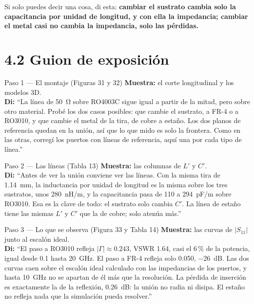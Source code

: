 \documentclass[11pt,letterpaper]{article}
\begin{document}
Si solo puedes decir una cosa, di esta: \textbf{cambiar el sustrato cambia solo la capacitancia por unidad de longitud, y con ella la impedancia; cambiar el metal casi no cambia la impedancia, solo las pérdidas.}

\section*{4.2 Guion de exposición}

\begin{paso}{Paso 1 --- El montaje (Figuras 31 y 32)}
\textbf{Muestra:} el corte longitudinal y los modelos 3D.\\
\textbf{Di:} ``La línea de \SI{50}{\ohm} sobre RO4003C sigue igual a partir de la mitad, pero sobre otro material. Probé los dos casos posibles: que cambie el sustrato, a FR-4 o a RO3010, y que cambie el metal de la tira, de cobre a estaño. Los dos planos de referencia quedan en la unión, así que lo que mido es solo la frontera. Como en las otras, corregí los puertos con líneas de referencia, aquí una por cada tipo de línea.''
\end{paso}

\begin{paso}{Paso 2 --- Las líneas (Tabla 13)}
\textbf{Muestra:} las columnas de $L'$ y $C'$.\\
\textbf{Di:} ``Antes de ver la unión conviene ver las líneas. Con la misma tira de \SI{1.14}{mm}, la inductancia por unidad de longitud es la misma sobre los tres sustratos, unos 280~nH/m, y la capacitancia pasa de 110 a 294~pF/m sobre RO3010. Esa es la clave de todo: el sustrato solo cambia $C'$. La línea de estaño tiene las mismas $L'$ y $C'$ que la de cobre; solo atenúa más.''
\end{paso}

\begin{paso}{Paso 3 --- Lo que se observa (Figura 33 y Tabla 14)}
\textbf{Muestra:} las curvas de $|S_{11}|$ junto al escalón ideal.\\
\textbf{Di:} ``El paso a RO3010 refleja $|\Gamma|\approx0.243$, VSWR 1.64, casi el 6\,\% de la potencia, igual desde \SI{0.1}{} hasta \SI{20}{GHz}. El paso a FR-4 refleja solo 0.050, \SI{-26}{dB}. Las dos curvas caen sobre el escalón ideal calculado con las impedancias de los puertos, y hasta \SI{10}{GHz} no se apartan de él más que la resolución. La pérdida de inserción es exactamente la de la reflexión, \SI{0.26}{dB}: la unión no radia ni disipa. El estaño no refleja nada que la simulación pueda resolver.''
\end{paso}
\end{document}
